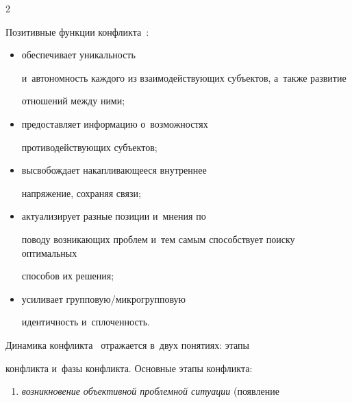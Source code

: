 \begin{multicols}{2}

  

  Позитивные функции конфликта~\cite{8-r}: 

  \begin{itemize}

  \item обеспечивает уникальность 

и~автономность каждого из взаимодействующих субъектов, а~также развитие 

отношений между ними; 

\item предоставляет информацию о~воз\-мож\-но\-стях 

противодействующих субъектов; 

\item высвобождает накапливающееся внутреннее 

на\-пря\-же\-ние, сохраняя связи; 

\item актуализирует разные позиции и~мнения по 

поводу возникающих проб\-лем и~тем самым способствует поиску оптимальных 

способов их решения; 

\item усиливает груп\-по\-вую/мик\-ро\-груп\-по\-вую 

идентичность и~сплоченность.

\end{itemize}

  

  Динамика конфликта~\cite{10-r, 11-r} отражается в~двух понятиях: этапы 

конфликта и~фазы конфликта. Основные этапы конфликта: 

\begin{enumerate}[(1)]

\item \textit{возникновение объективной проблемной ситуации} (появление 


\end{enumerate}
\end{multicols}
